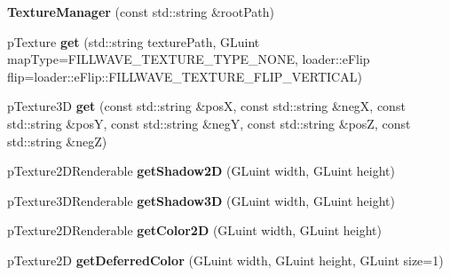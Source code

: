 \begin{DoxyCompactItemize}
\item 
\hypertarget{classfillwave_1_1manager_1_1TextureManager_a78507f2a56fb12e6731214b4188e0f46}{}{\bfseries Texture\+Manager} (const std\+::string \&root\+Path)\label{classfillwave_1_1manager_1_1TextureManager_a78507f2a56fb12e6731214b4188e0f46}

\item 
\hypertarget{classfillwave_1_1manager_1_1TextureManager_a8813baa38a348446170d75bb7701a562}{}p\+Texture {\bfseries get} (std\+::string texture\+Path, G\+Luint map\+Type=F\+I\+L\+L\+W\+A\+V\+E\+\_\+\+T\+E\+X\+T\+U\+R\+E\+\_\+\+T\+Y\+P\+E\+\_\+\+N\+O\+N\+E, loader\+::e\+Flip flip=loader\+::e\+Flip\+::\+F\+I\+L\+L\+W\+A\+V\+E\+\_\+\+T\+E\+X\+T\+U\+R\+E\+\_\+\+F\+L\+I\+P\+\_\+\+V\+E\+R\+T\+I\+C\+A\+L)\label{classfillwave_1_1manager_1_1TextureManager_a8813baa38a348446170d75bb7701a562}

\item 
\hypertarget{classfillwave_1_1manager_1_1TextureManager_a9976210f8b5ee16462f1b858b3936296}{}p\+Texture3\+D {\bfseries get} (const std\+::string \&pos\+X, const std\+::string \&neg\+X, const std\+::string \&pos\+Y, const std\+::string \&neg\+Y, const std\+::string \&pos\+Z, const std\+::string \&neg\+Z)\label{classfillwave_1_1manager_1_1TextureManager_a9976210f8b5ee16462f1b858b3936296}

\item 
\hypertarget{classfillwave_1_1manager_1_1TextureManager_aefa1fff947dcf90934855dd2dd1daa41}{}p\+Texture2\+D\+Renderable {\bfseries get\+Shadow2\+D} (G\+Luint width, G\+Luint height)\label{classfillwave_1_1manager_1_1TextureManager_aefa1fff947dcf90934855dd2dd1daa41}

\item 
\hypertarget{classfillwave_1_1manager_1_1TextureManager_acebae6c67d9ed5d26b0326a14cc536ea}{}p\+Texture3\+D\+Renderable {\bfseries get\+Shadow3\+D} (G\+Luint width, G\+Luint height)\label{classfillwave_1_1manager_1_1TextureManager_acebae6c67d9ed5d26b0326a14cc536ea}

\item 
\hypertarget{classfillwave_1_1manager_1_1TextureManager_a310720a772e2c3d2bd1d6afe1252e820}{}p\+Texture2\+D\+Renderable {\bfseries get\+Color2\+D} (G\+Luint width, G\+Luint height)\label{classfillwave_1_1manager_1_1TextureManager_a310720a772e2c3d2bd1d6afe1252e820}

\item 
\hypertarget{classfillwave_1_1manager_1_1TextureManager_ae977db54b989232c0c11c9e990a7b2cc}{}p\+Texture2\+D {\bfseries get\+Deferred\+Color} (G\+Luint width, G\+Luint height, G\+Luint size=1)\label{classfillwave_1_1manager_1_1TextureManager_ae977db54b989232c0c11c9e990a7b2cc}


\end{DoxyCompactItemize}
